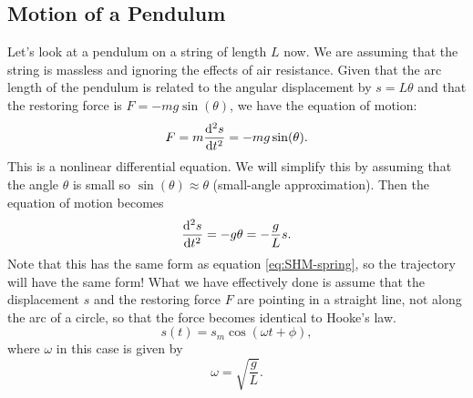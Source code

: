 \documentclass[../classical_mechanics.tex]{subfiles}
\begin{document}
        \subsection{Motion of a Pendulum}\label{subsec:motion-of-a-pendulum}
            Let's look at a pendulum on a string of length $L$ now.
            We are assuming that the string is massless and ignoring the effects of air resistance.
            Given that the arc length of the pendulum is related to the angular displacement by $s=L\theta$ and that the restoring force is $F=-mg\sin(\theta)$, we have the equation of motion:
            \begin{equation}\label{eq:SHM-pendulum-s-analytic}
                F=m\dv[2]{s}{t}=-mg\sin(\theta).
            \end{equation}
            This is a nonlinear differential equation. We will simplify this by assuming that the angle $\theta$ is small so $\sin(\theta)\approx\theta$ (small-angle approximation).
            Then the equation of motion becomes
            \begin{equation}
                \dv[2]{s}{t}=-g\theta=-\frac{g}{L}s.
            \end{equation}
            Note that this has the same form as equation \ref{eq:SHM-spring}, so the trajectory will have the same form!
            What we have effectively done is assume that the displacement $s$ and the restoring force $F$ are pointing in a straight line, not along the arc of a circle, so that the force becomes identical to Hooke's law.
            \begin{equation}
                s(t)=s_m\cos(\omega t+\phi),
            \end{equation}
            where $\omega$ in this case is given by
            \begin{equation}
                \omega=\sqrt{\frac{g}{L}}.
            \end{equation}
\end{document}
